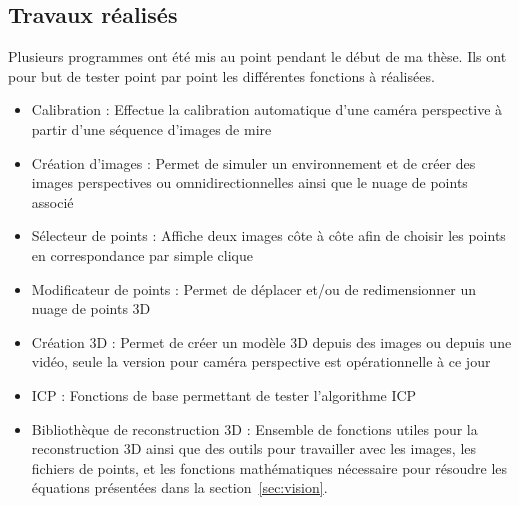 \subsection{Travaux réalisés}

Plusieurs programmes ont été mis au point pendant le début de ma thèse.
Ils ont pour but de tester point par point les différentes fonctions à réalisées.
\begin{itemize}
\item Calibration : Effectue la calibration automatique d'une caméra perspective à partir d'une séquence d'images de mire
\item Création d'images :  Permet de simuler un environnement et de créer des images perspectives ou omnidirectionnelles ainsi que le nuage de points associé
\item Sélecteur de points : Affiche deux images côte à côte afin de choisir les points en correspondance par simple clique
\item Modificateur de points : Permet de déplacer et/ou de redimensionner un nuage de points 3D
\item Création 3D : Permet de créer un modèle 3D depuis des images ou depuis une vidéo, seule la version pour caméra perspective est opérationnelle à ce jour
\item ICP : Fonctions de base permettant de tester l'algorithme ICP
\item Bibliothèque de reconstruction 3D : Ensemble de fonctions utiles pour la reconstruction 3D ainsi que des outils pour travailler avec les images, les fichiers de points, et les fonctions mathématiques nécessaire pour résoudre les équations présentées dans la section~\ref{sec:vision}.
\end{itemize}

